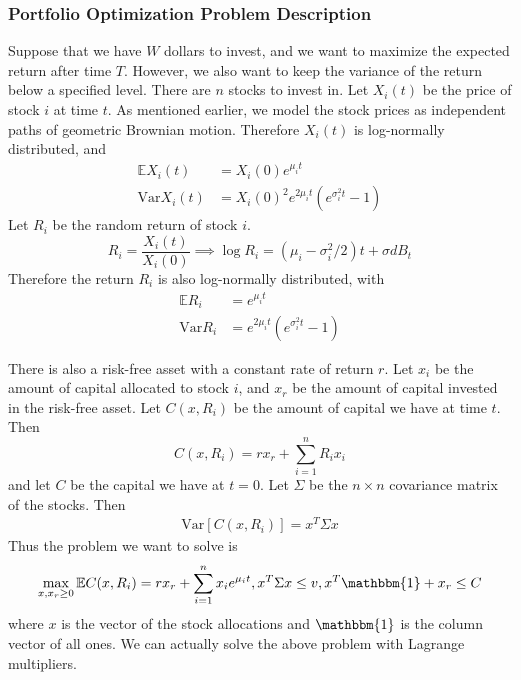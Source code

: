 \documentclass{amsart}
\theoremstyle{definition}
\theoremstyle{remark}
\begin{document}
\subsubsection{Portfolio Optimization Problem Description}
Suppose that we have $W$ dollars to invest, and we want to maximize the expected return after time $T$. However, we also want to keep the variance of the return below a specified level. There are $n$ stocks to invest in. Let $X_i(t)$ be the price of stock $i$ at time $t$. As mentioned earlier, we model the stock prices as independent paths of geometric Brownian motion. Therefore $X_i(t)$ is log-normally distributed, and
\begin{align*}
\mathbb{E} X_i(t) &= X_i(0)e^{\mu_i t}\\
\text{Var} X_i(t) &= X_i(0)^2e^{2\mu_i t}\left(e^{\sigma_i^2 t} -1\right)
\end{align*}
Let $R_i$ be the random return of stock $i$.
\begin{equation*}
R_i = \frac{X_i(t)}{X_i(0)} \implies \log R_i = (\mu_i - \sigma_i^2 / 2) t + \sigma dB_t
\end{equation*}
Therefore the return $R_i$ is also log-normally distributed, with
\begin{align*}
\mathbb{E}R_i &= e^{\mu_i t}\\
\text{Var}R_i &= e^{2\mu_i t}\left(e^{\sigma_i^2 t} -1\right)
\end{align*}

There is also a risk-free asset with a constant rate of return $r$. Let $x_i$ be the amount of capital allocated to stock $i$, and $x_r$ be the amount of capital invested in the risk-free asset. Let $C(x, R_i)$ be the amount of capital we have at time $t$. Then
\begin{equation*}
C(x, R_i) = r x_r + \sum_{i=1}^n R_i x_i 
\end{equation*}
and let $C$ be the capital we have at $t=0$.
Let $\Sigma$ be the $n\times n$ covariance matrix of the stocks. Then
\begin{align*}
\text{Var}[ C(x,R_i)] = x^T \Sigma x
\end{align*}
Thus the problem we want to solve is
\begin{equation}\label{eq:markowitz}
\max_{x,x_r\ge 0} \mathbb{E}C(x, R_i) = r x_r + \sum_{i=1}^n x_i e^{\mu_i t}, x^T \Sigma x \le v, x^T \mathbbm{1} + x_r \le C
\end{equation}
where $x$ is the vector of the stock allocations and $\mathbbm{1}$ is the column vector of all ones.
We can actually solve the above problem with Lagrange multipliers.
\end{document}
